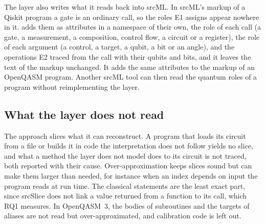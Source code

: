 The layer also writes what it reads back into srcML. In srcML's markup of a Qiskit program a gate is an ordinary
call, so the roles E1 assigns appear nowhere in it. \tool{} adds them as attributes in a namespace of their own, the
role of each call (a gate, a measurement, a composition, control flow, a circuit or a register), the role of each
argument (a control, a target, a qubit, a bit or an angle), and the operations E2 traced from the call with their
qubits and bits, and it leaves the text of the markup unchanged. It adds the same attributes to the markup of an
OpenQASM program. Another srcML tool can then read the quantum roles of a program without reimplementing the layer.

\subsection{What the layer does not read}\label{sec:b-limits}
The approach slices what it can reconstruct. A program that loads its circuit from a file or builds it in code the
interpretation does not follow yields no slice, and what a method the layer does not model does to its circuit is not
traced, both reported with their cause. Over-approximation keeps slices sound but can make them larger than needed, for
instance when an index depends on input the program reads at run time. The classical statements are the least exact
part, since srcSlice does not link a value returned from a function to its call, which RQ1 measures. In OpenQASM~3,
the bodies of subroutines and the targets of aliases are not read but over-approximated, and calibration code is left
out.
